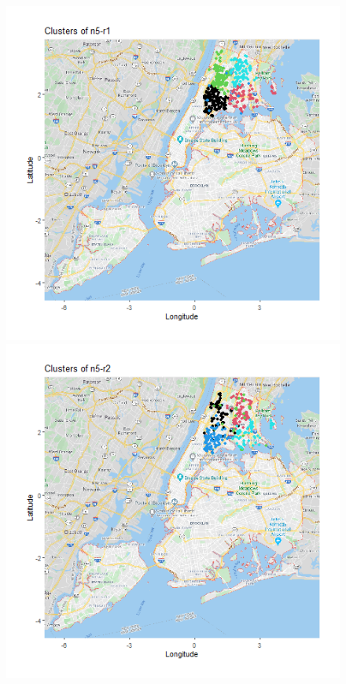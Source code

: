 \documentclass{FR16}
\begin{document}
\begin{figure}[!htb]
   
   \begin{minipage}{0.33\textwidth}
     \centering
     \includegraphics[width=1\linewidth]{figures/clust-n5-r1.png} 
   \end{minipage}\hfill
   \begin{minipage}{0.33\textwidth}
     \centering
     \includegraphics[width=1\linewidth]{figures/clust-n5-r2.png}

\end{minipage}
\end{figure}
\end{document}
